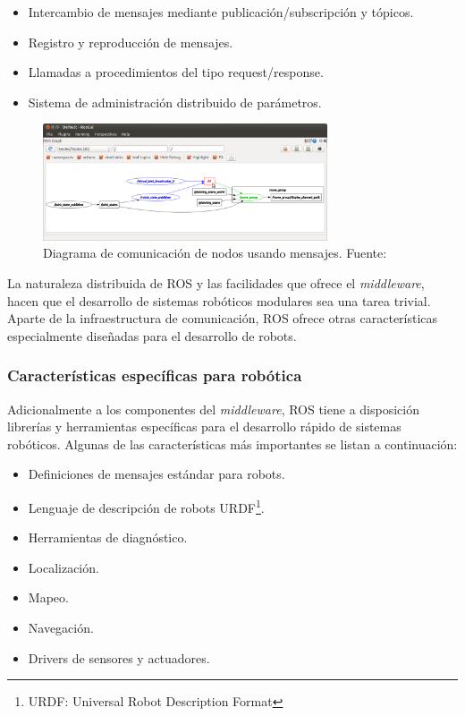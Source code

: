         \begin{itemize}
            \item Intercambio de mensajes mediante publicación/subscripción y tópicos.
            \item Registro y reproducción de mensajes.
            \item Llamadas a procedimientos del tipo request/response.
            \item Sistema de administración distribuido de parámetros.
        \end{itemize}

        \begin{figure}[!h] 
            \centering
            \includegraphics[width=0.75\textwidth]{img/rqtgraph}
            \caption[Diagrama de comunicación de nodos]{Diagrama de comunicación de nodos usando mensajes. Fuente: \cite{roswiki} }
            \label{fig:rqtgraph}
        \end{figure}

        La naturaleza distribuida de ROS y las facilidades que ofrece el \textit{middleware}, hacen que el desarrollo de sistemas 
        robóticos modulares sea una tarea trivial. Aparte de la infraestructura de comunicación, ROS ofrece otras características
        especialmente diseñadas para el desarrollo de robots.
        
        \subsubsection{Características específicas para robótica}
        Adicionalmente a los componentes del \textit{middleware}, ROS tiene a disposición librerías y herramientas específicas 
        para el desarrollo rápido de sistemas robóticos. Algunas de las características más importantes se listan a continuación:

        \begin{itemize}
            \item Definiciones de mensajes estándar para robots.
            \item Lenguaje de descripción de robots URDF\footnote{URDF: Universal Robot Description Format}.
            \item Herramientas de diagnóstico.
            \item Localización.
            \item Mapeo.
            \item Navegación.
            \item Drivers de sensores y actuadores.
        \end{itemize}

